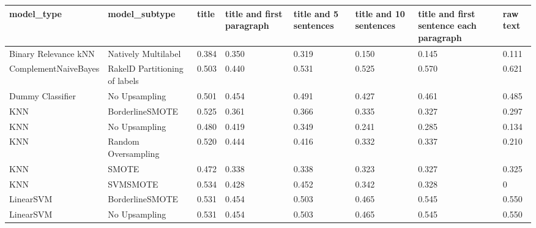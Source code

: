 \begin{tabular}{llllllll}
\toprule
                     model\_type &                 model\_subtype & title & title and first paragraph & title and 5 sentences & title and 10 sentences & title and first sentence each paragraph &  raw text \\
\midrule
           Binary Relevance kNN &           Natively Multilabel & 0.384 &                     0.350 &                 0.319 &                  0.150 &                                   0.145 &     0.111 \\
           ComplementNaiveBayes & RakelD Partitioning of labels & 0.503 &                     0.440 &                 0.531 &                  0.525 &                                   0.570 &     0.621 \\
               Dummy Classifier &                 No Upsampling & 0.501 &                     0.454 &                 0.491 &                  0.427 &                                   0.461 &     0.485 \\
                            KNN &               BorderlineSMOTE & 0.525 &                     0.361 &                 0.366 &                  0.335 &                                   0.327 &     0.297 \\
                            KNN &                 No Upsampling & 0.480 &                     0.419 &                 0.349 &                  0.241 &                                   0.285 &     0.134 \\
                            KNN &           Random Oversampling & 0.520 &                     0.444 &                 0.416 &                  0.332 &                                   0.337 &     0.210 \\
                            KNN &                         SMOTE & 0.472 &                     0.338 &                 0.338 &                  0.323 &                                   0.327 &     0.325 \\
                            KNN &                      SVMSMOTE & 0.534 &                     0.428 &                 0.452 &                  0.342 &                                   0.328 &         0 \\
                      LinearSVM &               BorderlineSMOTE & 0.531 &                     0.454 &                 0.503 &                  0.465 &                                   0.545 &     0.550 \\
                      LinearSVM &                 No Upsampling & 0.531 &                     0.454 &                 0.503 &                  0.465 &                                   0.545 &     0.550 \\

\end{tabular}
